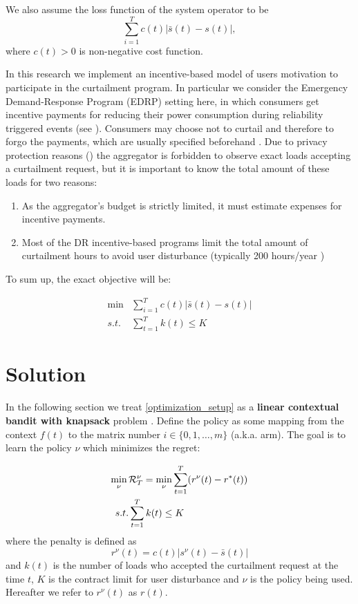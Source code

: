 We also assume the loss function of the system operator to be 
\[
\sum_{i=1}^T c(t) |{\bar s}(t) - s(t)|, 
\]
where $c(t) > 0$  is non-negative cost function. 



In this research we implement an incentive-based model of users motivation to participate in the curtailment program. In particular we consider the Emergency Demand-Response Program (EDRP) setting here, in which consumers get incentive payments for reducing their power consumption during reliability triggered events (see \cite{Aalami2010}). Consumers may choose not to curtail and therefore to forgo the payments, which are usually specified beforehand \cite{Vardakas2015}. Due to privacy protection reasons (\cite{Lisovich2010}) the aggregator is forbidden to observe exact loads accepting a curtailment request, but it is important to know the total amount of these loads for two reasons: 
    \begin{enumerate}
        \item As the aggregator's budget is strictly limited, it must estimate expenses for incentive payments. 
        \item Most of the DR incentive-based programs limit the total amount of curtailment hours to avoid user disturbance (typically 200 hours/year \cite{Aalami2010b})       
    \end{enumerate}
    
To sum up, the exact objective will be:

\begin{align}
    \label{optimization_setup}
    \min & \sum_{i=1}^T c(t) |{\bar s}(t) - s(t)| \\
    s.t. & \sum_{t=1}^T k(t) \leq K 
\end{align}

\section{Solution}
In the following section we treat \ref{optimization_setup} as a \textbf{linear contextual bandit with knapsack} problem \cite{Badanidiyuru2013}. Define the policy as some mapping from the context $f(t)$ to the matrix number $i \in \{0, 1, \dots, m\}$ (a.k.a. arm). The goal is to learn the policy $\nu$ which minimizes the regret:

\begin{equation}
    \begin{split}
    \min_{\nu}\, & {\cal R}^{\nu}_T = \min_{\nu} \sum_{t=1}^T(r^{\nu}(t) - r^*(t)) \\
     s.t. & \sum_{t=1}^T k(t) \leq K 
     \end{split}
\end{equation}
where the penalty is defined as
\[
    r^{\nu}(t) = c(t)|s^{\nu}(t) - {\bar s}(t)|
\]
and $k(t)$ is the number of loads who accepted the curtailment request at the time $t$, $K$ is the contract limit for user disturbance and $\nu$ is the policy being used. Hereafter we refer to $r^{\nu}(t)$ as $r(t)$.

